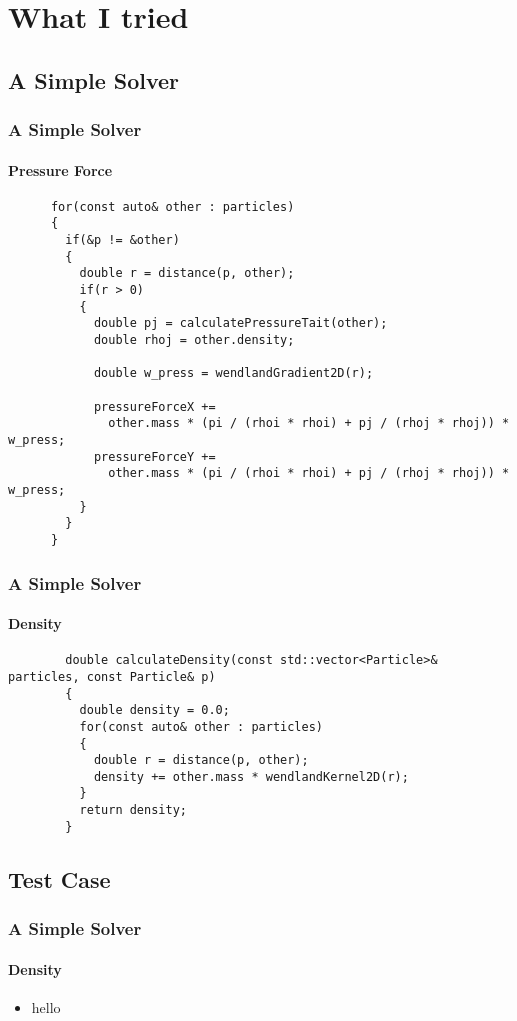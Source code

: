 \documentclass[notheorems, aspectratio=169]{beamer}
\begin{document}
  \section{What I tried} 
  \frame{\tableofcontents[currentsection]}

  \subsection{A Simple Solver}
      
  \begin{frame}[fragile]
    \frametitle{A Simple Solver}
    \framesubtitle{Pressure Force}
    
    \begin{lstlisting}
      for(const auto& other : particles)
      {
        if(&p != &other)
        {
          double r = distance(p, other);
          if(r > 0)
          {
            double pj = calculatePressureTait(other);
            double rhoj = other.density;
  
            double w_press = wendlandGradient2D(r); 
  
            pressureForceX +=
              other.mass * (pi / (rhoi * rhoi) + pj / (rhoj * rhoj)) * w_press;
            pressureForceY +=
              other.mass * (pi / (rhoi * rhoi) + pj / (rhoj * rhoj)) * w_press;
          }
        }
      }
    \end{lstlisting}
    
    \end{frame}


    \begin{frame}[fragile]
      \frametitle{A Simple Solver}
      \framesubtitle{Density}
      
      \begin{lstlisting}
        double calculateDensity(const std::vector<Particle>& particles, const Particle& p)
        {
          double density = 0.0;
          for(const auto& other : particles)
          {
            double r = distance(p, other);
            density += other.mass * wendlandKernel2D(r);
          }
          return density;
        }
      \end{lstlisting}
      
      \end{frame}
      
    
  \subsection{Test Case}


  \begin{frame}[fragile]
    \frametitle{A Simple Solver}
    \framesubtitle{Density}
    
    \begin{itemize}
      \item hello

    \end{itemize}
    
    \end{frame}
    
\end{document}
